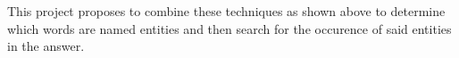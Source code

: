 This project proposes to combine these techniques as shown above to determine which words are named entities and then search for the occurence of said entities in the answer.



